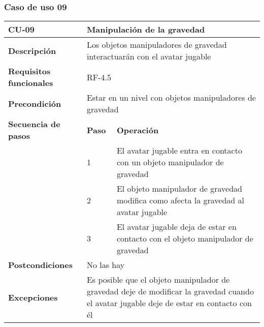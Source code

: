 \subsubsection{Caso de uso 09}
\begin{longtable}{lll}
\textbf{CU-09}                                   & \multicolumn{2}{l}{Manipulación de la gravedad}                                                                                                              \\ \hline
\endfirsthead
%
\endhead
%
\textbf{Descripción}                             & \multicolumn{2}{l}{Los objetos manipuladores de gravedad interactuarán con el avatar jugable}                                                                \\ \hline
\textbf{Requisitos funcionales}                  & \multicolumn{2}{l}{RF-4.5}                                                                                                                                   \\ \hline
\textbf{Precondición}                            & \multicolumn{2}{l}{Estar en un nivel con objetos manipuladores de gravedad}                                                                                  \\ \hline
\multicolumn{1}{l|}{\textbf{Secuencia de pasos}} & \textbf{Paso}                             & \textbf{Operación}                                                                                               \\ \cline{2-3} 
\multicolumn{1}{l|}{}                            & 1                                         & El avatar jugable entra en contacto con un objeto manipulador de gravedad                                        \\
\multicolumn{1}{l|}{}                            & 2                                         & El objeto manipulador de gravedad modifica como afecta la gravedad al avatar jugable                             \\
\multicolumn{1}{l|}{}                            & 3                                         & El avatar jugable deja de estar en contacto con el objeto manipulador de gravedad                                \\ \hline
\textbf{Postcondiciones}                         & \multicolumn{2}{l}{No las hay}                                                                                                                               \\ \hline
\textbf{Excepciones}                             & \multicolumn{2}{l}{Es posible que el objeto manipulador de gravedad deje de modificar la gravedad cuando el avatar jugable deje de estar en contacto con él} \\ \hline

\end{longtable}
